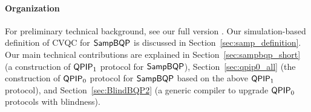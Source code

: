 \paragraph{Organization}
For preliminary technical background, see our full version \cite{full-version}. 
Our simulation-based definition of CVQC for $\operatorname{\mathsf{SampBQP}}$ is discussed in Section~\ref{sec:samp_definition}. 
Our main technical contributions are explained in Section~\ref{sec:sampbqp_short} (a construction of $\operatorname{\mathsf{QPIP}}_1$ protocol for $\operatorname{\mathsf{SampBQP}}$), 
Section~\ref{sec:qpip0_all} (the construction of $\operatorname{\mathsf{QPIP}}_0$ protocol for $\operatorname{\mathsf{SampBQP}}$ based on the above $\operatorname{\mathsf{QPIP}}_1$ protocol), 
and Section~\ref{sec:BlindBQP2} (a generic compiler to upgrade $\operatorname{\mathsf{QPIP}}_0$ protocols with blindness). 
